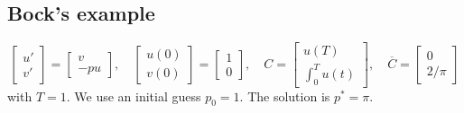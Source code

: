 \documentclass[english,12pt,a4paper]{article}
\begin{document}
\subsection{Bock's example}\label{subsec:}
%
\cite{Bock87}
%
\begin{equation}\label{eq:}
\begin{bmatrix}
u'\\ v'
\end{bmatrix}
=
\begin{bmatrix}
v\\ -p u
\end{bmatrix}
,\quad 
\begin{bmatrix}
u(0)\\ v(0)
\end{bmatrix}
=
\begin{bmatrix}
1\\ 0
\end{bmatrix},\quad
C = 
\begin{bmatrix}
u(T)\\ \int_0^T u(t)
\end{bmatrix},\quad
\overline{C} = 
\begin{bmatrix}
0\\ 2/\pi
\end{bmatrix}
\end{equation}
%
with $T=1$. We use an initial guess $p_0=1$. The  solution is $p^*=\pi$.
\end{document}
